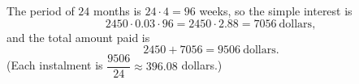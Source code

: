 The period of $24$ months is $24\cdot4=96$ weeks, so the simple interest is
\[2450\cdot0.03\cdot96=2450\cdot2.88=7056\ \text{dollars},\]
and the total amount paid is
\[2450+7056=\boxed{9506}\ \text{dollars}.\]
(Each instalment is $\dfrac{9506}{24}\approx396.08$ dollars.)
